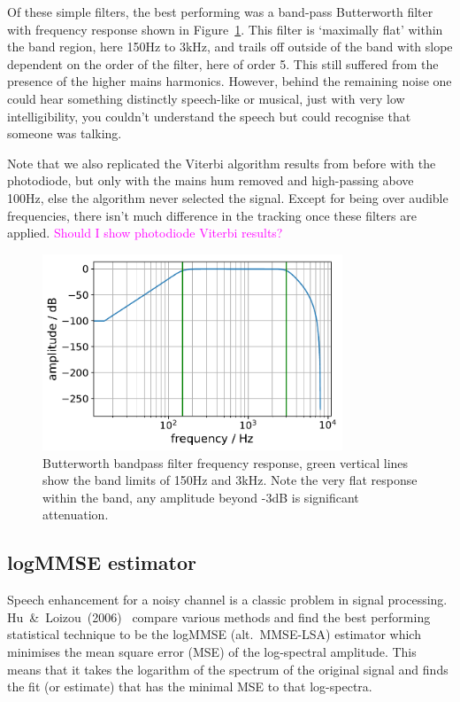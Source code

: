 \documentclass[prb,preprint]{revtex4-1}
\newcommand{\jam}{\textcolor{magenta}}
\begin{document}
Of these simple filters, the best performing was a band-pass Butterworth filter with frequency response shown in Figure~\ref{fig:butterworth}. This filter is `maximally flat' within the band region, here 150Hz to 3kHz, and trails off outside of the band with slope dependent on the order of the filter, here of order 5. This still suffered from the presence of the higher mains harmonics. However, behind the remaining noise one could hear something distinctly speech-like or musical, just with very low intelligibility, you couldn’t understand the speech but could recognise that someone was talking.


Note that we also replicated the Viterbi algorithm results from before with the photodiode, but only with the mains hum removed and high-passing above 100Hz, else the algorithm never selected the signal. Except for being over audible frequencies, there isn’t much difference in the tracking once these filters are applied. \jam{Should I show photodiode Viterbi results?}

\begin{figure}%
	\includegraphics[width=0.8\textwidth]{figures/butterworth_150_3000-cropped.pdf}
	\caption{Butterworth bandpass filter frequency response, green vertical lines show the band limits of 150Hz and 3kHz. Note the very flat response within the band, any amplitude beyond -3dB is significant attenuation.}
	\label{fig:butterworth}
\end{figure}

\subsection{logMMSE estimator}

Speech enhancement for a noisy channel is a classic problem in signal processing. Hu~\&~Loizou~(2006)~\cite{SubjectiveComparison} compare various methods and find the best performing statistical technique to be the logMMSE (alt.\ MMSE-LSA) estimator which minimises the mean square error (MSE) of the log-spectral amplitude. This means that it takes the logarithm of the spectrum of the original signal and finds the fit (or estimate) that has the minimal MSE to that log-spectra.
\end{document}
